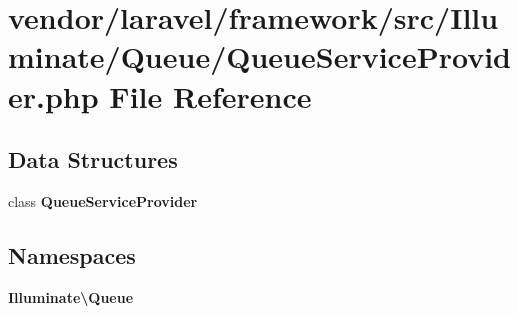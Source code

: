 \section{vendor/laravel/framework/src/\+Illuminate/\+Queue/\+Queue\+Service\+Provider.php File Reference}
\label{_queue_service_provider_8php}
\subsection*{Data Structures}
\begin{DoxyCompactItemize}
\item 
class {\bf Queue\+Service\+Provider}
\end{DoxyCompactItemize}
\subsection*{Namespaces}
\begin{DoxyCompactItemize}
\item 
 {\bf Illuminate\textbackslash{}\+Queue}
\end{DoxyCompactItemize}
